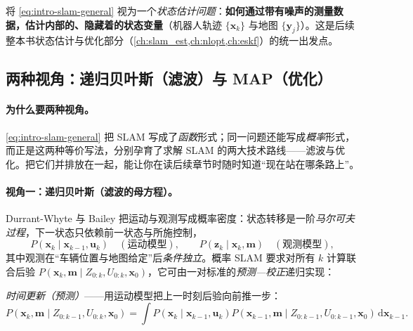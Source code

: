\begin{definition}\label{def:intro-state-est}
将 \cref{eq:intro-slam-general} 视为一个\emph{状态估计问题}：\textbf{如何通过带有噪声的测量数据，估计内部的、隐藏着的状态变量}（机器人轨迹 $\{\mathbf{x}_k\}$ 与地图 $\{\mathbf{y}_j\}$）\cite{gaoxiang2019slam14}。这是后续整本书状态估计与优化部分（\cref{ch:slam_est,ch:nlopt,ch:eskf}）的统一出发点。
\end{definition}

\subsection{两种视角：递归贝叶斯（滤波）与 MAP（优化）}
\label{sec:intro-two-views}
\paragraph{为什么要两种视角。}
\cref{eq:intro-slam-general} 把 SLAM 写成了\emph{函数}形式；同一问题还能写成\emph{概率}形式，而正是这两种等价写法，分别孕育了求解 SLAM 的两大技术路线——滤波与优化。把它们并排放在一起，能让你在读后续章节时随时知道“现在站在哪条路上”。

\paragraph{视角一：递归贝叶斯（滤波的母方程）。}
Durrant-Whyte 与 Bailey\cite{durrantwhyte2006slam} 把运动与观测写成概率密度：状态转移是一阶\emph{马尔可夫过程}，下一状态只依赖前一状态与所施控制，
\begin{equation}
  P\!\left(\mathbf{x}_k\mid \mathbf{x}_{k-1},\mathbf{u}_k\right)\quad(\text{运动模型}),\qquad
  P\!\left(\mathbf{z}_k\mid \mathbf{x}_k,\mathbf{m}\right)\quad(\text{观测模型}),
  \label{eq:intro-dw-models}
\end{equation}
其中观测在“车辆位置与地图给定”后\emph{条件独立}。概率 SLAM 要求对所有 $k$ 计算联合后验 $P(\mathbf{x}_k,\mathbf{m}\mid Z_{0:k},U_{0:k},\mathbf{x}_0)$，它可由一对标准的\emph{预测—校正}递归实现\cite{durrantwhyte2006slam}：

\emph{时间更新（预测）}——用运动模型把上一时刻后验向前推一步：
\begin{equation}
  P\!\left(\mathbf{x}_k,\mathbf{m}\mid Z_{0:k-1},U_{0:k},\mathbf{x}_0\right)
  =\int P\!\left(\mathbf{x}_k\mid \mathbf{x}_{k-1},\mathbf{u}_k\right)
  P\!\left(\mathbf{x}_{k-1},\mathbf{m}\mid Z_{0:k-1},U_{0:k-1},\mathbf{x}_0\right)\,\mathrm{d}\mathbf{x}_{k-1}.
  \label{eq:intro-dw-predict}
\end{equation}

